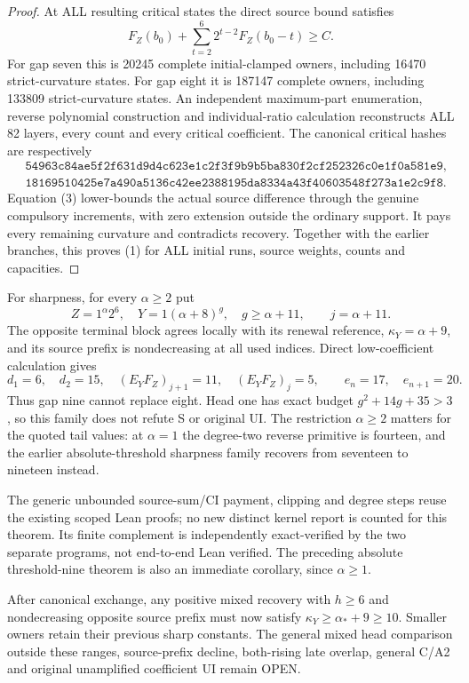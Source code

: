 \begin{proof}
At ALL resulting critical states the direct source bound satisfies
\[
                    F_Z(b_0)+\sum_{t=2}^{6}2^{t-2}F_Z(b_0-t)\ge C.       \tag{3}
\]
For gap seven this is 20245 complete initial-clamped owners,
including 16470 strict-curvature states. For gap eight it is
187147 complete owners, including 133809 strict-curvature states.
An independent maximum-part enumeration, reverse polynomial
construction and individual-ratio calculation reconstructs ALL
82 layers, every count and every critical coefficient.
The canonical critical hashes are respectively
\[
\begin{split}
&\texttt{54963c84ae5f2f631d9d4c623e1c2f3f9b9b5ba830f2cf252326c0e1f0a581e9},\\
&\texttt{18169510425e7a490a5136c42ee2388195da8334a43f40603548f273a1e2c9f8}.
\end{split}
\]
Equation (3) lower-bounds the actual source difference through
the genuine compulsory increments, with zero extension outside
the ordinary support. It pays every remaining curvature and
contradicts recovery. Together with the earlier branches, this
proves (1) for ALL initial runs, source weights, counts and capacities.
\end{proof}

For sharpness, for every $\alpha\ge2$ put
\[
 Z=1^\alpha2^6,\quad Y=1(\alpha+8)^g,
 \quad g\ge\alpha+11,\qquad j=\alpha+11.
\]
The opposite terminal block agrees locally with its renewal
reference, $\kappa_Y=\alpha+9$, and its source prefix is
nondecreasing at all used indices. Direct low-coefficient calculation gives
\[
 d_1=6,\quad d_2=15,\quad
 (E_YF_Z)_{j+1}=11,\quad(E_YF_Z)_j=5,
 \qquad e_n=17,\quad e_{n+1}=20.
\]
Thus gap nine cannot replace eight. Head one has exact budget
$g^2+14g+35>3$, so this family does not refute S or original UI.
The restriction $\alpha\ge2$ matters for the quoted tail values:
at $\alpha=1$ the degree-two reverse primitive is fourteen,
and the earlier absolute-threshold sharpness family recovers
from seventeen to nineteen instead.

The generic unbounded source-sum/CI payment, clipping and degree
steps reuse the existing scoped Lean proofs; no new distinct
kernel report is counted for this theorem. Its finite complement
is independently exact-verified by the two separate programs,
not end-to-end Lean verified. The preceding absolute threshold-nine
theorem is also an immediate corollary, since $\alpha\ge1$.

After canonical exchange, any positive mixed recovery with $h\ge6$
and nondecreasing opposite source prefix must now satisfy
$\kappa_Y\ge\alpha_*+9\ge10$. Smaller owners retain their
previous sharp constants. The general mixed head comparison outside
these ranges, source-prefix decline, both-rising late overlap,
general C/A2 and original unamplified coefficient UI remain OPEN.
